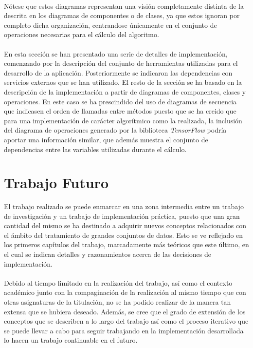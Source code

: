 \documentclass{subfiles}
\begin{document}
          \paragraph{}
          Nótese que estos diagramas representan una visión completamente distinta de la descrita en los diagramas de componentes o de clases, ya que estos ignoran por completo dicha organización, centrandose únicamente en el conjunto de operaciones necesarias para el cálculo del algoritmo.

      \paragraph{}
      En esta sección se han presentado una serie de detalles de implementación, comenzando por la descripción del conjunto de herramientas utilizadas para el desarrollo de la aplicación. Posteriormente se indicaron las dependencias con servicios externos que se han utilizado. El resto de la sección se ha basado en la descripción de la implementación a partir de diagramas de componentes, clases y operaciones. En este caso se ha prescindido del uso de diagramas de secuencia que indicasen el orden de llamadas entre métodos puesto que se ha creido que para una implementación de carácter algorítmico como la realizada, la inclusión del diagrama de operaciones generado por la biblioteca \emph{TensorFlow} podría aportar una información similar, que además muestra el conjunto de dependencias entre las variables utilizadas durante el cálculo.

    \section{Trabajo Futuro}
    \label{sec:future_work}

      \paragraph{}
      El trabajo realizado se puede enmarcar en una zona intermedia entre un trabajo de investigación y un trabajo de implementación práctica, puesto que una gran cantidad del mismo se ha destinado a adquirir nuevos conceptos relacionados con el ámbito del tratamiento de grandes conjuntos de datos. Esto se ve reflejado en los primeros capítulos del trabajo, marcadamente más teóricos que este último, en el cual se indican detalles y razonamientos acerca de las decisiones de implementación.

      \paragraph{}
      Debido al tiempo limitado en la realización del trabajo, así como el contexto académico junto con la compaginación de la realización al mismo tiempo que con otras asignaturas de la titulación, no se ha podido realizar de la manera tan extensa que se hubiera deseado. Además, se cree que el grado de extensión de los conceptos que se describen a lo largo del trabajo así como el proceso iterativo que se puede llevar a cabo para seguir trabajando en la implementación desarrollada lo hacen un trabajo continuable en el futuro.
\end{document}

